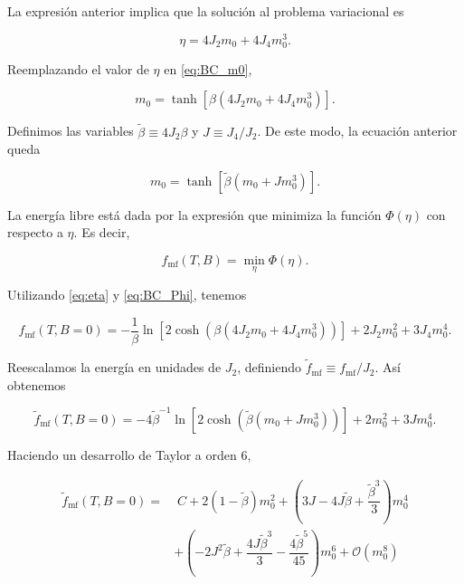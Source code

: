 \documentclass[10pt]{article}
\begin{document}
La expresi\'on anterior implica que la soluci\'on al problema variacional es 

\begin{equation}\label{eq:eta}
\eta = 4 J_2 m_0 + 4 J_4 m_0^3.
\end{equation}

Reemplazando el valor de $\eta$ en \ref{eq:BC_m0},

\begin{equation}
m_0 = \tanh\left[\beta (4 J_2 m_0 + 4 J_4 m_0^3)\right].
\end{equation}

Definimos las variables $\tilde{\beta} \equiv 4 J_2 \beta$ y $J \equiv J_4/J_2$. De este modo, la ecuaci\'on anterior queda

\begin{equation}
m_0 = \tanh\left[\tilde{\beta} (m_0 + J m_0^3)\right].
\end{equation}

La energ\'ia libre est\'a dada por la expresi\'on que minimiza la funci\'on $\Phi(\eta)$ con respecto a $\eta$. Es decir,

\begin{equation}
f_{\mathrm{mf}}(T,B) = \min_{\eta} \Phi(\eta).
\end{equation}

Utilizando \ref{eq:eta} y \ref{eq:BC_Phi}, tenemos

\begin{equation}
f_{\mathrm{mf}}(T,B=0) = -\dfrac{1}{\beta} \ln \left[2 \cosh\left(\beta ( 4 J_2 m_0 + 4 J_4 m_0^3)\right) \right] +2 J_2 m_0^2 + 3 J_4 m_0^4.
\end{equation}

Reescalamos la energ\'ia en unidades de $J_2$, definiendo $\tilde{f}_{\mathrm{mf}} \equiv f_{\mathrm{mf}}/J_2$. As\'i obtenemos

\begin{equation}
\tilde{f}_{\mathrm{mf}}(T,B=0) = -4\tilde{\beta}^{-1} \ln \left[2 \cosh\left(\tilde{\beta} ( m_0 + J m_0^3)\right) \right] +2 m_0^2 + 3 J m_0^4.
\end{equation}

Haciendo un desarrollo de Taylor a orden 6,

\begin{align}
\tilde{f}_{\mathrm{mf}}(T,B=0) =& \;C + 2(1-\tilde{\beta}) m_0^2 + 
\left(3J - 4J\tilde{\beta} + \dfrac{\tilde{\beta}^3}{3} \right) m_0^4 \nonumber \\
&+ \left(-2 J^2\tilde{\beta} + \dfrac{4J\tilde{\beta}^3}{3} - \dfrac{4\tilde{\beta}^5}{45}\right) m_0^6 + \mathcal{O}(m_0^8)
\end{align}
\end{document}
